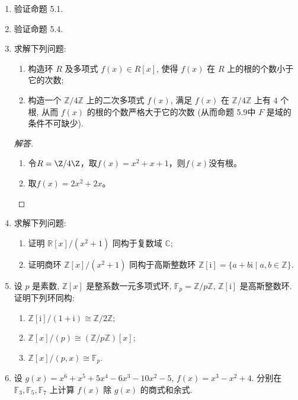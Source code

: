 \begin{enumerate}
\item 验证命题 5.1.

\item 验证命题 5.4.

\item 求解下列问题:
\begin{enumerate}[label=(\arabic*)]
    \item 构造环 $ R $ 及多项式 $ f(x) \in R[x] $, 使得 $ f(x) $ 在 $ R $ 上的根的个数小于它的次数;
    \item 构造一个 $ \mathbb{Z}/4\mathbb{Z} $ 上的二次多项式 $ f(x) $, 满足 $ f(x) $ 在 $ \mathbb{Z}/4\mathbb{Z} $ 上有 $4$ 个根, 从而 $ f(x) $ 的根的个数严格大于它的次数 (从而命题 5.9中 $ F $ 是域的条件不可缺少).
\end{enumerate}
\begin{proof}[解答]
    \begin{enumerate}[label=(\arabic*)]
    \item 令$R=\Z/4\Z$，取$f(x)=x^2+x+1$，则$f(x)$没有根。
    \item 取$f(x)=2x^2+2x$。\qedhere
    \end{enumerate}
\end{proof}

\item 求解下列问题:
\begin{enumerate}[label=(\arabic*)]
    \item 证明 $ \mathbb{R}[x]/(x^2 + 1) $ 同构于复数域 $ \mathbb{C} $;
    \item 证明商环 $ \mathbb{Z}[x]/(x^2 + 1) $ 同构于高斯整数环 $ \mathbb{Z}[\mathrm{i}] = \{a + b\mathrm{i} \mid a, b \in \mathbb{Z}\} $.
\end{enumerate}

\item 设 $ p $ 是素数, $ \mathbb{Z}[x] $ 是整系数一元多项式环, $ \mathbb{F}_p = \mathbb{Z}/p\mathbb{Z} $, $ \mathbb{Z}[\mathrm{i}] $ 是高斯整数环. 证明下列环同构:
\begin{enumerate}[label=(\arabic*)]
    \item $ \mathbb{Z}[\mathrm{i}]/(1 + \mathrm{i}) \cong \mathbb{Z}/2\mathbb{Z} $;
    \item $ \mathbb{Z}[x]/(p) \cong (\mathbb{Z}/p\mathbb{Z})[x] $;
    \item $ \mathbb{Z}[x]/(p, x) \cong \mathbb{F}_p $.
\end{enumerate}

\item 设 $ g(x) = x^6 + x^5 + 5x^4 - 6x^3 - 10x^2 - 5 $, $ f(x) = x^3 - x^2 + 4 $. 分别在 $\mathbb{F}_3, \mathbb{F}_5, \mathbb{F}_7$ 上计算 $ f(x) $ 除 $ g(x) $ 的商式和余式.


\end{enumerate}
